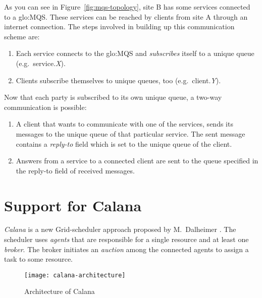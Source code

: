 As you can see in  Figure~\ref{fig:mqs-topology}, site B has some services
connected to  a \gls{glo:MQS}.  These services can  be reached  by clients
from site A through an internet connection. The steps involved in building
up this communication scheme are:
\begin{enumerate}
\item  Each service  connects to  the \gls{glo:MQS}  and \emph{subscribes}
  itself to a unique queue (e.g.~service.\emph{X}).
\item    Clients   subscribe    themselves   to    unique    queues,   too
  (e.g.~client.\emph{Y}).
\end{enumerate}

Now  that each  party is  subscribed to  its own  unique queue,  a two-way
communication is possible:
\begin{enumerate}
\item A client  that wants to communicate with one  of the services, sends
  its messages  to the unique queue  of that particular  service. The sent
  message  contains a  \emph{reply-to} field  which is  set to  the unique
  queue of the client.
\item Answers from  a service to a connected client are  sent to the queue
  specified in the reply-to field of received messages.
\end{enumerate}

\section{Support for Calana}
\label{sec:calana-support}

\emph{Calana} is  a new  Grid-scheduler approach proposed  by M.~Dalheimer
\cite{dalheimer05agentbased}.  The  scheduler uses \emph{agents}  that are
responsible for  a single  resource and at  least one  \emph{broker}.  The
broker initiates an \emph{auction} among  the connected agents to assign a
task to some resource.

\begin{figure}[htbp]
  \begin{center}
    \texttt{[image: calana-architecture]}
  \end{center}
  \caption{Architecture of Calana}
  \label{fig:calana-architecture}
\end{figure}

